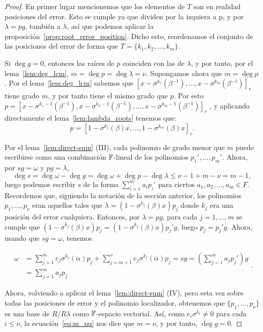 \begin{proof}
    En primer lugar mencionemos que los elementos de \(T\) son en realidad posiciones del error. Esto se cumple ya que dividen por la izquiera a p, y por \(\lambda = pg\), también a \(\lambda\), así que podemos aplicar la proposición~\ref{prop:root_error_position}. Dicho esto, reordenamos el conjunto de las posiciones del error de forma que \(T = \{k_1, k_2, \ldots, k_m\}\).

    Si \(\deg g = 0\), entonces las raíces de \(p\) coinciden con las de  \(\lambda\), y por tanto, por el lema~\ref{lem:deg_lcm}, \(m = \deg p = \deg \lambda = \nu\). Supongamos ahora que \(m = \deg p\). Por el lema~\ref{lem:deg_lcm} sabemos que \( [x - \sigma^{k_1}(\beta^{-1}), \ldots, x - \sigma^{k_m}(\beta^{-1})]_r \) tiene grado \(m\), y por tanto tiene el mismo grado que \(p\). Por esto
\(
p = [x - \sigma^{k_1-1}(\beta^{-1}), x - \sigma^{k_2-1}(\beta^{-1}), \dots, x - \sigma^{k_m-1}(\beta^{-1})]_r
\)
, y aplicando directamente el lema~\ref{lem:lambda_roots} tenemos que:
    \[
    p = {[1 - \sigma^{k_1}(\beta)x, \ldots, 1 - \sigma^{k_m}(\beta)x]}_{r}
    .\]

Por el lema~\ref{lem:direct-sum} (III), cada polinomio de grado menor que \(m\) puede escribirse como una combinación  \(\mathbb{F}\)-lineal de los polinomios  \(p_1', \ldots, p_m'\). Ahora, por \(sg = \omega\) y \(pg = \lambda\),
\[
\deg s = \deg \omega - \deg g = \deg \omega + \deg p - \deg \lambda \le \nu -1 + m - \nu = m-1
,\]
luego podemos escribir \(s\) de la forma \(\sum_{i=1}^{m} a_ip_i'\) para ciertos \(a_1, a_2, \ldots, a_m \in F\). Recordemos que, siguiendo la notación de la sección anterior, los polinomios \(p_1, \ldots, p_\nu\) eran aquellos tales que \(\lambda = (1 - \sigma^{k_j}(\beta)x)p_j\) donde \(k_j\) era una posición del error cualquiera. Entonces, por \(\lambda = pg\), para cada \(j = 1, \ldots, m\) se cumple que \((1 - \sigma ^{k_j}(\beta)x)p_j = (1 - \sigma^{k_j}(\beta)x)p_j'g\), luego \(p_j = p_j'g\). Ahora, usando que \(sg = \omega\), tenemos

\begin{equation}
\label{eq:m_nu}
\begin{aligned}
    \omega &= \sum_{j=1}^{m}e_{j}\sigma^{k_j}(\alpha)p_j + \sum_{j=m+1}^{\nu}e_{j}\sigma^{k_j}(\alpha)p_j = sg  = \left( \sum_{j=1}^{m}a_j p_j' \right) g \\
    &= \sum_{j=1}^{m} a_j p_j
\end{aligned}
.
\end{equation}

Ahora, volviendo a aplicar el lema~\ref{lem:direct-sum} (IV), pero esta vez sobre todas las posiciones de error y el polinomio localizador, obtenemos que \(\{p_1, \ldots, p_{\nu}\}\) es una base de \(R / R\lambda\) como  \(\mathbb{F}\)-espacio vectorial. Así, como \(e_i\sigma^{k_i} \neq 0\) para cada \(i \le \nu\), la ecuación~\ref{eq:m_nu} nos dice que \(m = \nu\), y por tanto, \(\deg g = 0\).
\end{proof}

